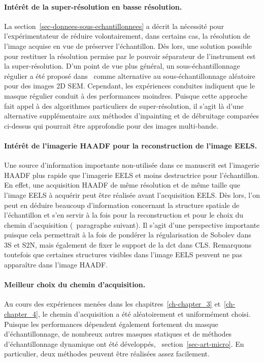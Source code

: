 \paragraph{Intérêt de la super-résolution en basse résolution.} La section~\ref{sec-donnees-sous-echantillonnees} a décrit la nécessité pour l'expérimentateur de réduire volontairement, dans certains cas, la résolution de l'image acquise en vue de préserver l'échantillon. Dès lors, une solution possible pour restituer la résolution permise par le pouvoir séparateur de l'instrument est la super-résolution. D'un point de vue plus général, un sous-échantillonnage régulier a été proposé dans~\cite{trampert2018ultramicroscopy} comme alternative au sous-échantillonnage aléatoire pour des images 2D SEM. Cependant, les expériences conduites indiquent que le masque régulier conduit à des performances moindres. Puisque cette approche fait appel à des algorithmes particuliers de super-résolution, il s'agit là d'une alternative supplémentaire aux méthodes d'inpainting et de débruitage comparées ci-dessus qui pourrait être approfondie pour des images multi-bande. 

\paragraph{Intérêt de l'imagerie HAADF pour la reconstruction de l'image EELS.} Une source d'information importante non-utilisée dans ce manuscrit est l'imagerie HAADF plus rapide que l'imagerie EELS et moins destructrice pour l'échantillon. En effet, une acquisition HAADF de même résolution et de même taille que l'image EELS à acquérir peut être réalisée avant l'acquisition EELS. Dès lors, l'on peut en déduire beaucoup d'information concernant la structure spatiale de l'échantillon et s'en servir à la fois pour la reconstruction et pour le choix du chemin d'acquisition (\cf\ paragraphe suivant). Il s'agit d'une perspective importante puisque cela permettrait à la fois de pondérer la régularisation de Sobolev dans 3S et S2N, mais également de fixer le support de la \gls{dct} dans CLS. Remarquons toutefois que certaines structures visibles dans l'image EELS peuvent ne pas apparaître dans l'image HAADF.

\paragraph{Meilleur choix du chemin d'acquisition.} Au cours des expériences menées dans les chapitres~\ref{ch-chapter_3} et~\ref{ch-chapter_4}, le chemin d'acquisition a été aléatoirement et uniformément choisi. Puisque les performances dépendent également fortement du masque d'échantillonnage, de nombreux autres masques statiques et de méthodes d'échantillonnage dynamique ont été développés, \cf\ section~\ref{sec-art-micro}. En particulier, deux méthodes peuvent être réalisées assez facilement.

